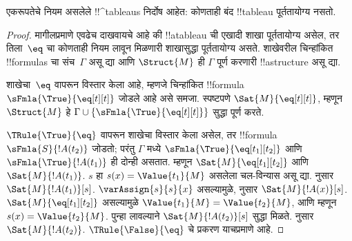 \documentclass[../../../include/open-logic-section]{subfiles}
\begin{document}


\begin{prop}
एकरूपतेचे नियम असलेले !!^{tableau}s निर्दोष आहेत: कोणताही बंद !!{tableau}
  पूर्ततायोग्य नसतो.
\end{prop}

\begin{proof}
मागीलप्रमाणे एवढेच दाखवायचे आहे की !!a{tableau} ची एखादी शाखा पूर्ततायोग्य
असेल, तर तिला~$\eq$ चा कोणताही नियम लावून मिळणारी शाखासुद्धा पूर्ततायोग्य
असते. शाखेवरील चिन्हांकित !!{formula}s चा संच~$\Gamma$ असू द्या आणि
$\Struct{M}$ ही $\Gamma$ पूर्ण करणारी !!a{structure} असू द्या.

शाखेचा~$\eq$ वापरून विस्तार केला आहे, म्हणजे चिन्हांकित
!!{formula}~$\sFmla{\True}{\eq[t][t]}$ जोडले आहे असे समजा. स्पष्टपणे
$\Sat{M}{\eq[t][t]}$, म्हणून $\Struct{M}$ हे
$\Gamma \cup \{\sFmla{\True}{\eq[t][t]}\}$ सुद्धा पूर्ण करते.

$\TRule{\True}{\eq}$ वापरून शाखेचा विस्तार केला असेल, तर
!!{formula}~$\sFmla{S}{!A(t_2)}$ जोडतो; परंतु $\Gamma$ मध्ये
$\sFmla{\True}{\eq[t_1][t_2]}$ आणि $\sFmla{\True}{!A(t_1)}$ ही दोन्ही
असतात. म्हणून $\Sat{M}{\eq[t_1][t_2]}$ आणि $\Sat{M}{!A(t_1)}$.
$s$ हा $s(x) = \Value{t_1}{M}$ असलेला चल-विन्यास असू द्या.
 नुसार
$\Sat{M}{!A(t_1)}[s]$. $\varAssign{s}{s}{x}$ असल्यामुळे,
 नुसार $\Sat{M}{!A(x)}[s]$.
$\Sat{M}{\eq[t_1][t_2]}$ असल्यामुळे
$\Value{t_1}{M} = \Value{t_2}{M}$, आणि म्हणून
$s(x) = \Value{t_2}{M}$.  पुन्हा
लावल्याने $\Sat{M}{!A(t_2)}[s]$ सुद्धा मिळते.
 नुसार
$\Sat{M}{!A(t_2)}$. $\TRule{\False}{\eq}$ चे प्रकरण याचप्रमाणे आहे.
\end{proof}
\end{document}

